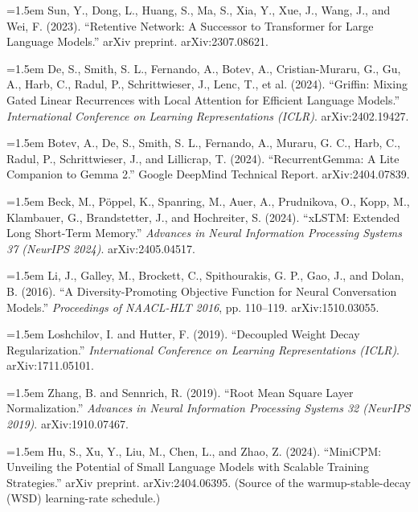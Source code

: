 \documentclass[11pt]{article}
\begin{document}
\par\hangindent=1.5em
Sun, Y., Dong, L., Huang, S., Ma, S., Xia, Y., Xue, J., Wang, J., and Wei, F. (2023). ``Retentive Network: A Successor to Transformer for Large Language Models.'' arXiv preprint. arXiv:2307.08621.

\par\hangindent=1.5em
De, S., Smith, S. L., Fernando, A., Botev, A., Cristian-Muraru, G., Gu, A., Harb, C., Radul, P., Schrittwieser, J., Lenc, T., et al. (2024). ``Griffin: Mixing Gated Linear Recurrences with Local Attention for Efficient Language Models.'' \textit{International Conference on Learning Representations (ICLR)}. arXiv:2402.19427.

\par\hangindent=1.5em
Botev, A., De, S., Smith, S. L., Fernando, A., Muraru, G. C., Harb, C., Radul, P., Schrittwieser, J., and Lillicrap, T. (2024). ``RecurrentGemma: A Lite Companion to Gemma 2.'' Google DeepMind Technical Report. arXiv:2404.07839.

\par\hangindent=1.5em
Beck, M., P\"oppel, K., Spanring, M., Auer, A., Prudnikova, O., Kopp, M., Klambauer, G., Brandstetter, J., and Hochreiter, S. (2024). ``xLSTM: Extended Long Short-Term Memory.'' \textit{Advances in Neural Information Processing Systems 37 (NeurIPS 2024)}. arXiv:2405.04517.

\par\hangindent=1.5em
Li, J., Galley, M., Brockett, C., Spithourakis, G. P., Gao, J., and Dolan, B. (2016). ``A Diversity-Promoting Objective Function for Neural Conversation Models.'' \textit{Proceedings of NAACL-HLT 2016}, pp. 110--119. arXiv:1510.03055.

\par\hangindent=1.5em
Loshchilov, I. and Hutter, F. (2019). ``Decoupled Weight Decay Regularization.'' \textit{International Conference on Learning Representations (ICLR)}. arXiv:1711.05101.

\par\hangindent=1.5em
Zhang, B. and Sennrich, R. (2019). ``Root Mean Square Layer Normalization.'' \textit{Advances in Neural Information Processing Systems 32 (NeurIPS 2019)}. arXiv:1910.07467.

\par\hangindent=1.5em
Hu, S., Xu, Y., Liu, M., Chen, L., and Zhao, Z. (2024). ``MiniCPM: Unveiling the Potential of Small Language Models with Scalable Training Strategies.'' arXiv preprint. arXiv:2404.06395. (Source of the warmup-stable-decay (WSD) learning-rate schedule.)
\end{document}
